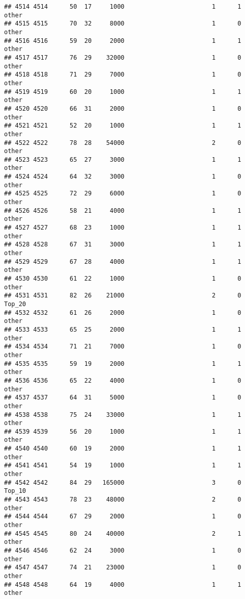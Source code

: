 \documentclass[
]{article}
\begin{document}
\begin{verbatim}
## 4514 4514      50  17     1000                        1      1    other
## 4515 4515      70  32     8000                        1      0    other
## 4516 4516      59  20     2000                        1      1    other
## 4517 4517      76  29    32000                        1      0    other
## 4518 4518      71  29     7000                        1      0    other
## 4519 4519      60  20     1000                        1      1    other
## 4520 4520      66  31     2000                        1      0    other
## 4521 4521      52  20     1000                        1      1    other
## 4522 4522      78  28    54000                        2      0    other
## 4523 4523      65  27     3000                        1      1    other
## 4524 4524      64  32     3000                        1      0    other
## 4525 4525      72  29     6000                        1      0    other
## 4526 4526      58  21     4000                        1      1    other
## 4527 4527      68  23     1000                        1      1    other
## 4528 4528      67  31     3000                        1      1    other
## 4529 4529      67  28     4000                        1      1    other
## 4530 4530      61  22     1000                        1      0    other
## 4531 4531      82  26    21000                        2      0   Top_20
## 4532 4532      61  26     2000                        1      0    other
## 4533 4533      65  25     2000                        1      1    other
## 4534 4534      71  21     7000                        1      0    other
## 4535 4535      59  19     2000                        1      1    other
## 4536 4536      65  22     4000                        1      0    other
## 4537 4537      64  31     5000                        1      0    other
## 4538 4538      75  24    33000                        1      1    other
## 4539 4539      56  20     1000                        1      1    other
## 4540 4540      60  19     2000                        1      1    other
## 4541 4541      54  19     1000                        1      1    other
## 4542 4542      84  29   165000                        3      0   Top_10
## 4543 4543      78  23    48000                        2      0    other
## 4544 4544      67  29     2000                        1      0    other
## 4545 4545      80  24    40000                        2      1    other
## 4546 4546      62  24     3000                        1      0    other
## 4547 4547      74  21    23000                        1      0    other
## 4548 4548      64  19     4000                        1      1    other

\end{verbatim}
\end{document}
